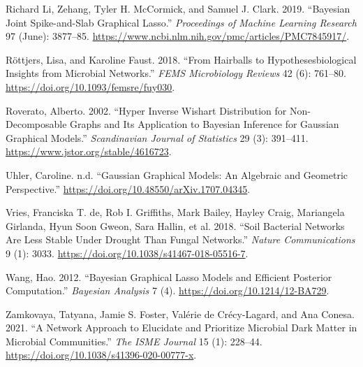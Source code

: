 \documentclass[
]{article}
\newlength{\cslhangindent}
\newlength{\cslentryspacingunit} %
\newenvironment{CSLReferences}[2] %
 {%
  \setlength{\parindent}{0pt}
  \ifodd #1
  \let\oldpar\par
  \def\par{\hangindent=\cslhangindent\oldpar}
  \fi
  \setlength{\parskip}{#2\cslentryspacingunit}
 }%
 {}
\begin{document}
\begin{CSLReferences}{1}{0}
\leavevmode{}%
Richard Li, Zehang, Tyler H. McCormick, and Samuel J. Clark. 2019.
{``Bayesian Joint Spike-and-Slab Graphical Lasso.''} \emph{Proceedings
of Machine Learning Research} 97 (June): 3877--85.
\url{https://www.ncbi.nlm.nih.gov/pmc/articles/PMC7845917/}.

\leavevmode{}%
Röttjers, Lisa, and Karoline Faust. 2018. {``From Hairballs to
Hypotheses{\textendash}biological Insights from Microbial Networks.''}
\emph{FEMS Microbiology Reviews} 42 (6): 761--80.
\url{https://doi.org/10.1093/femsre/fuy030}.

\leavevmode{}%
Roverato, Alberto. 2002. {``Hyper Inverse Wishart Distribution for
Non-Decomposable Graphs and Its Application to Bayesian Inference for
Gaussian Graphical Models.''} \emph{Scandinavian Journal of Statistics}
29 (3): 391--411. \url{https://www.jstor.org/stable/4616723}.

\leavevmode{}%
Uhler, Caroline. n.d. {``Gaussian Graphical Models: An Algebraic and
Geometric Perspective.''}
\url{https://doi.org/10.48550/arXiv.1707.04345}.

\leavevmode{}%
Vries, Franciska T. de, Rob I. Griffiths, Mark Bailey, Hayley Craig,
Mariangela Girlanda, Hyun Soon Gweon, Sara Hallin, et al. 2018. {``Soil
Bacterial Networks Are Less Stable Under Drought Than Fungal
Networks.''} \emph{Nature Communications} 9 (1): 3033.
\url{https://doi.org/10.1038/s41467-018-05516-7}.

\leavevmode{}%
Wang, Hao. 2012. {``Bayesian Graphical Lasso Models and Efficient
Posterior Computation.''} \emph{Bayesian Analysis} 7 (4).
\url{https://doi.org/10.1214/12-BA729}.

\leavevmode{}%
Zamkovaya, Tatyana, Jamie S. Foster, Valérie de Crécy-Lagard, and Ana
Conesa. 2021. {``A Network Approach to Elucidate and Prioritize
Microbial Dark Matter in Microbial Communities.''} \emph{The ISME
Journal} 15 (1): 228--44.
\url{https://doi.org/10.1038/s41396-020-00777-x}.

\end{CSLReferences}
\end{document}
